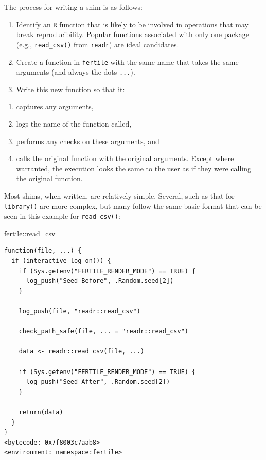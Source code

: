 \documentclass[12pt,twoside]{reedthesis}
\newenvironment{Shaded}{\begin{snugshade}}{\end{snugshade}}
\newcommand{\NormalTok}[1]{#1}
\newcommand{\SpecialCharTok}[1]{\textcolor[rgb]{0.00,0.00,0.00}{#1}}
\providecommand{\tightlist}{%
  \setlength{\itemsep}{0pt}\setlength{\parskip}{0pt}}
\begin{document}
The process for writing a shim is as follows:
\begin{enumerate}
\def\labelenumi{\arabic{enumi}.}
\item
  Identify an \texttt{R} function that is likely to be involved in operations that may break reproducibility. Popular functions associated with only one package (e.g., \texttt{read\_csv()} from \texttt{readr}) are ideal candidates.
\item
  Create a function in \texttt{fertile} with the same name that takes the same arguments (and always the dots \texttt{...}).
\item
  Write this new function so that it:
\end{enumerate}
\begin{enumerate}
\def\labelenumi{\alph{enumi})}
\tightlist
\item
  captures any arguments,
\item
  logs the name of the function called,
\item
  performs any checks on these arguments, and
\item
  calls the original function with the original arguments. Except where warranted, the execution looks the same to the user as if they were calling the original function.
\end{enumerate}
Most shims, when written, are relatively simple. Several, such as that for \texttt{library()} are more complex, but many follow the same basic format that can be seen in this example for \texttt{read\_csv()}:
\begin{Shaded}
\begin{Highlighting}[]
\NormalTok{fertile}\SpecialCharTok{::}\NormalTok{read\_csv}
\end{Highlighting}
\end{Shaded}
\begin{verbatim}
function(file, ...) {
  if (interactive_log_on()) {
    if (Sys.getenv("FERTILE_RENDER_MODE") == TRUE) {
      log_push("Seed Before", .Random.seed[2])
    }

    log_push(file, "readr::read_csv")

    check_path_safe(file, ... = "readr::read_csv")

    data <- readr::read_csv(file, ...)

    if (Sys.getenv("FERTILE_RENDER_MODE") == TRUE) {
      log_push("Seed After", .Random.seed[2])
    }

    return(data)
  }
}
<bytecode: 0x7f8003c7aab8>
<environment: namespace:fertile>
\end{verbatim}
\end{document}
